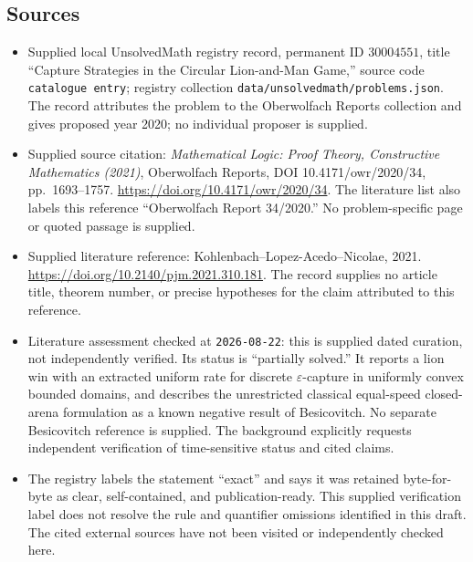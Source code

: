 \documentclass[11pt]{article}
\begin{document}
\subsection{Sources}
\begin{itemize}
\item Supplied local UnsolvedMath registry record, permanent ID \(30004551\), title ``Capture Strategies in the Circular Lion-and-Man Game,'' source code \texttt{catalogue entry}; registry collection \texttt{data/unsolvedmath/problems.json}. The record attributes the problem to the Oberwolfach Reports collection and gives proposed year 2020; no individual proposer is supplied.
\item Supplied source citation: \emph{Mathematical Logic: Proof Theory, Constructive Mathematics (2021)}, Oberwolfach Reports, DOI 10.4171/owr/2020/34, pp.\ 1693--1757. \url{https://doi.org/10.4171/owr/2020/34}. The literature list also labels this reference ``Oberwolfach Report 34/2020.'' No problem-specific page or quoted passage is supplied.
\item Supplied literature reference: Kohlenbach--Lopez-Acedo--Nicolae, 2021. \url{https://doi.org/10.2140/pjm.2021.310.181}. The record supplies no article title, theorem number, or precise hypotheses for the claim attributed to this reference.
\item Literature assessment checked at \texttt{2026-08-22}: this is supplied dated curation, not independently verified. Its status is ``partially solved.'' It reports a lion win with an extracted uniform rate for discrete \(\varepsilon\)-capture in uniformly convex bounded domains, and describes the unrestricted classical equal-speed closed-arena formulation as a known negative result of Besicovitch. No separate Besicovitch reference is supplied. The background explicitly requests independent verification of time-sensitive status and cited claims.
\item The registry labels the statement ``exact'' and says it was retained byte-for-byte as clear, self-contained, and publication-ready. This supplied verification label does not resolve the rule and quantifier omissions identified in this draft. The cited external sources have not been visited or independently checked here.
\end{itemize}
\end{document}

